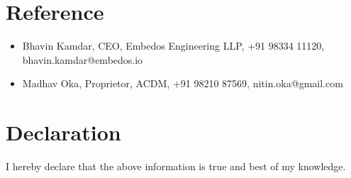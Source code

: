 \documentclass{article}
\begin{document}
\section{Reference}
	\begin{itemize}
		\item Bhavin Kamdar, CEO, Embedos Engineering LLP, +91 98334 11120, bhavin.kamdar@embedos.io
		\item Madhav Oka, Proprietor, ACDM, +91 98210 87569, nitin.oka@gmail.com
	\end{itemize}

\section{Declaration}
	I hereby declare that the above information is true and best of my knowledge.\\	
\end{document}
